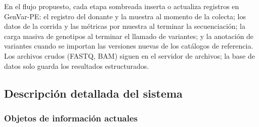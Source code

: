 \documentclass[11pt,a4paper]{article}
\begin{document}
En el flujo propuesto, cada etapa sombreada inserta o actualiza registros en GenVar-PE: el registro del donante y la muestra al momento de la colecta; los datos de la corrida y las métricas por muestra al terminar la secuenciación; la carga masiva de genotipos al terminar el llamado de variantes; y la anotación de variantes cuando se importan las versiones nuevas de los catálogos de referencia. Los archivos crudos (FASTQ, BAM) siguen en el servidor de archivos; la base de datos solo guarda los resultados estructurados.

\subsection{Descripción detallada del sistema}

\subsubsection{Objetos de información actuales}
\end{document}

